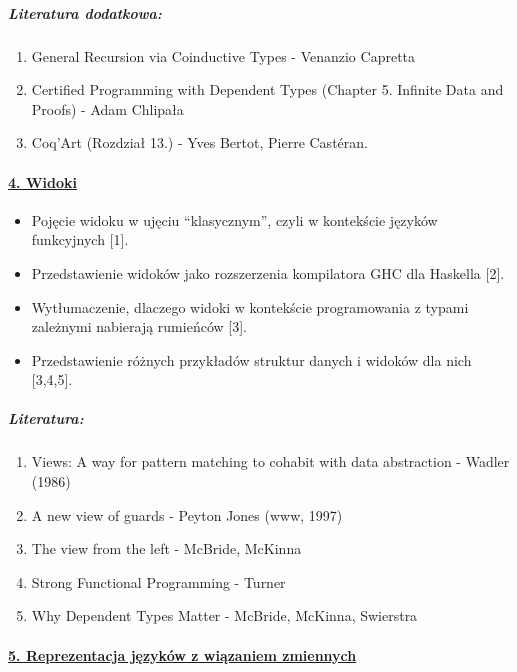 \documentclass[10pt, a4paper]{article}
\begin{document}
\subparagraph{Literatura dodatkowa:}

\begin{enumerate}
\addtolength{\itemsep}{-0.5\baselineskip}
 \item General Recursion via Coinductive Types - Venanzio Capretta
 \item Certified Programming with Dependent Types (Chapter 5. Infinite Data and Proofs) - Adam Chlipała
 \item Coq’Art (Rozdział 13.) - Yves Bertot, Pierre Castéran.
\end{enumerate}

\paragraph{\underline{4. Widoki}}

\begin{itemize}
\addtolength{\itemsep}{-0.5\baselineskip}
 \item Pojęcie widoku w ujęciu “klasycznym”, czyli w kontekście języków funkcyjnych [1].
 \item Przedstawienie widoków jako rozszerzenia kompilatora GHC dla Haskella [2].
 \item Wytłumaczenie, dlaczego widoki w kontekście programowania z typami zależnymi nabierają rumieńców [3].
 \item Przedstawienie różnych przykładów struktur danych i widoków dla nich [3,4,5].
\end{itemize}

\subparagraph{Literatura:}

\begin{enumerate}
\addtolength{\itemsep}{-0.5\baselineskip}
 \item Views: A way for pattern matching to cohabit with data abstraction - Wadler (1986)
 \item A new view of guards - Peyton Jones (www, 1997)
 \item The view from the left - McBride, McKinna
 \item Strong Functional Programming - Turner
 \item Why Dependent Types Matter - McBride, McKinna, Swierstra
\end{enumerate}

\paragraph{\underline{5. Reprezentacja języków z wiązaniem zmiennych}}
\end{document}
